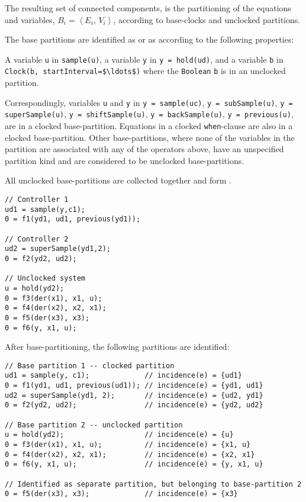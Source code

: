 The resulting set of connected components, is the partitioning of the equations and variables, $B_{i} = \left\langle E_{i},\, V_{i} \right\rangle$, according to base-clocks and unclocked partitions.

The base partitions are identified as  or as  according to the following properties:

A variable \lstinline!u! in \lstinline!sample(u)!, a variable \lstinline!y! in \lstinline!y = hold(ud)!, and a variable \lstinline!b! in \lstinline!Clock(b, startInterval=$\ldots$)! where the \lstinline!Boolean! \lstinline!b! is in an unclocked partition.

Correspondingly, variables \lstinline!u! and \lstinline!y! in
\lstinline!y = sample(uc)!,
\lstinline!y = subSample(u)!,
\lstinline!y = superSample(u)!,
\lstinline!y = shiftSample(u)!,
\lstinline!y = backSample(u)!,
\lstinline!y = previous(u)!,
are in a clocked base-partition.
Equations in a clocked \lstinline!when!-clause are also in a clocked base-partition.
Other base-partitions, where none of the variables in the partition are associated with any of the operators above, have an unspecified partition kind and are considered to be unclocked base-partitions.

All unclocked base-partitions are collected together and form .

\begin{example}
\begin{lstlisting}[language=modelica]
// Controller 1
ud1 = sample(y,c1);
0 = f1(yd1, ud1, previous(yd1));

// Controller 2
ud2 = superSample(yd1,2);
0 = f2(yd2, ud2);

// Unclocked system
u = hold(yd2);
0 = f3(der(x1), x1, u);
0 = f4(der(x2), x2, x1);
0 = f5(der(x3), x3);
0 = f6(y, x1, u);
\end{lstlisting}

After base-partitioning, the following partitions are identified:
\begin{lstlisting}[language=modelica]
// Base partition 1 -- clocked partition
ud1 = sample(y, c1);             // incidence(e) = {ud1}
0 = f1(yd1, ud1, previous(ud1)); // incidence(e) = {yd1, ud1}
ud2 = superSample(yd1, 2);       // incidence(e) = {ud2, yd1}
0 = f2(yd2, ud2);                // incidence(e) = {yd2, ud2}

// Base partition 2 -- unclocked partition
u = hold(yd2);                   // incidence(e) = {u}
0 = f3(der(x1), x1, u);          // incidence(e) = {x1, u}
0 = f4(der(x2), x2, x1);         // incidence(e) = {x2, x1}
0 = f6(y, x1, u);                // incidence(e) = {y, x1, u}

// Identified as separate partition, but belonging to base-partition 2
0 = f5(der(x3), x3);             // incidence(e) = {x3}
\end{lstlisting}
\end{example}


